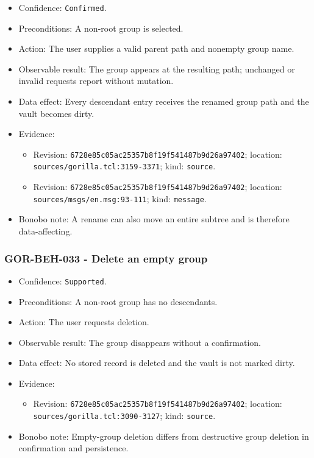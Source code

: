 \documentclass[
  letterpaper,
]{article}
\newcommand{\passthrough}[1]{#1}
\providecommand{\tightlist}{%
  \setlength{\itemsep}{0pt}\setlength{\parskip}{0pt}}
\begin{document}
\begin{itemize}
\tightlist
\item
  Confidence: \passthrough{\lstinline!Confirmed!}.
\item
  Preconditions: A non-root group is selected.
\item
  Action: The user supplies a valid parent path and nonempty group name.
\item
  Observable result: The group appears at the resulting path; unchanged or invalid requests report without mutation.
\item
  Data effect: Every descendant entry receives the renamed group path and the vault becomes dirty.
\item
  Evidence:

  \begin{itemize}
  \tightlist
  \item
    Revision: \nolinkurl{6728e85c05ac25357b8f19f541487b9d26a97402}; location: \nolinkurl{sources/gorilla.tcl:3159-3371};
    kind: \passthrough{\lstinline!source!}.
  \item
    Revision: \nolinkurl{6728e85c05ac25357b8f19f541487b9d26a97402}; location: \nolinkurl{sources/msgs/en.msg:93-111};
    kind: \passthrough{\lstinline!message!}.
  \end{itemize}
\item
  Bonobo note: A rename can also move an entire subtree and is therefore data-affecting.
\end{itemize}

\subsubsection{GOR-BEH-033 - Delete an empty group}\label{gor-beh-033---delete-an-empty-group}

\begin{itemize}
\tightlist
\item
  Confidence: \passthrough{\lstinline!Supported!}.
\item
  Preconditions: A non-root group has no descendants.
\item
  Action: The user requests deletion.
\item
  Observable result: The group disappears without a confirmation.
\item
  Data effect: No stored record is deleted and the vault is not marked dirty.
\item
  Evidence:

  \begin{itemize}
  \tightlist
  \item
    Revision: \nolinkurl{6728e85c05ac25357b8f19f541487b9d26a97402}; location: \nolinkurl{sources/gorilla.tcl:3090-3127};
    kind: \passthrough{\lstinline!source!}.
  \end{itemize}
\item
  Bonobo note: Empty-group deletion differs from destructive group deletion in confirmation and persistence.
\end{itemize}
\end{document}
